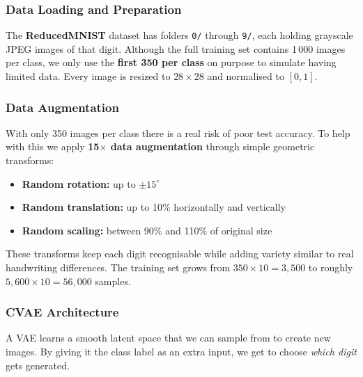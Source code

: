 \documentclass[12pt, a4paper]{article}
\begin{document}
\subsubsection{Data Loading and Preparation}

The \textbf{ReducedMNIST} dataset has folders \texttt{0/} through \texttt{9/}, each
holding grayscale JPEG images of that digit.  Although the full training set contains
1\,000 images per class, we only use the \textbf{first 350 per class} on purpose to
simulate having limited data.  Every image is resized to $28 \times 28$ and normalised
to $[0, 1]$.

\subsubsection{Data Augmentation}
\label{sec:augmentation}

With only 350 images per class there is a real risk of poor test accuracy.  To help with this
we apply \textbf{15$\times$ data augmentation} through simple geometric transforms:

\begin{itemize}
    \item \textbf{Random rotation:} up to $\pm15^{\circ}$
    \item \textbf{Random translation:} up to 10\% horizontally and vertically
    \item \textbf{Random scaling:} between 90\% and 110\% of original size
\end{itemize}

These transforms keep each digit recognisable while adding variety similar to
real handwriting differences.  The training set grows from
$350 \times 10 = 3{,}500$ to roughly $5{,}600 \times 10 = 56{,}000$ samples.

\subsubsection{CVAE Architecture}

A VAE learns a smooth latent space that we can sample from to create new images.
By giving it the class label as an extra input, we get to choose \emph{which digit}
gets generated.
\end{document}
